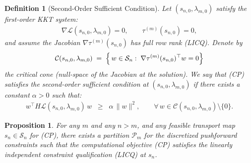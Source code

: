 \documentclass[12pt,leqno]{amsart}
\newtheorem{definition}{Definition}
\newtheorem{proposition}{Proposition}
\begin{document}
\begin{definition}[Second-Order Sufficient Condition]
\label{def:SOSC}
Let $(s_{n,0}, \lambda_{m,0})$ satisfy the first-order KKT system:
\begin{align*}
\nabla \mathcal{L}(s_{n,0}, \lambda_{m,0}) = 0,
\qquad
\tau^{(m)}(s_{n,0}) = 0,
\end{align*}
and assume the Jacobian $\nabla\tau^{(m)}(s_{n,0})$ has full row rank (LICQ). Denote by
\begin{align*}
\mathcal{C}(s_{n,0}, \lambda_{m,0})
\;=\;
\Bigl\{\,w\in \mathcal{S}_{n}
       :\;
       \nabla\tau^{(m)}(s_{n,0})^{\top}w = 0
\Bigr\}
\end{align*}
the critical cone (null-space of the Jacobian at the solution). We say that \textnormal{(CP)} satisfies the second-order sufficient condition at $(s_{n,0}, \lambda_{m,0})$ if there exists a constant $\alpha > 0$ such that:
\begin{align*}
w^{\top} H\mathcal{L}(s_{n,0}, \lambda_{m,0})\,w
\;\;\ge\;\;
\alpha\,\|w\|^{2},
\qquad
\forall\,w\in\mathcal{C}(s_{n,0}, \lambda_{m,0})\setminus\{0\}.
\end{align*}
\end{definition}

\begin{proposition}\label{prop:discrete-LICQ}
For any $m$ and any $n > m$, and any feasible transport map $s_n \in \mathcal{S}_n$ for \textnormal{(CP)}, there exists a partition $\mathcal{P}_m$ for the discretized pushforward constraints such that the computational objective \textnormal{(CP)} satisfies the linearly independent constraint qualification (LICQ) at $s_n$.
\end{proposition}
\end{document}
